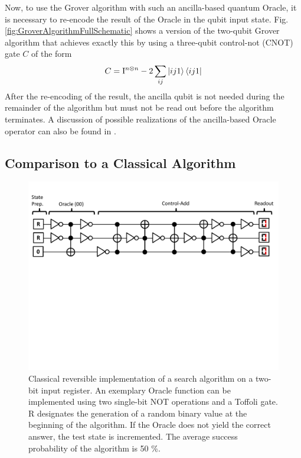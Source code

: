 \smallskip

Now, to use the Grover algorithm with such an ancilla-based quantum Oracle, it is necessary to re-encode the result of the Oracle in the qubit input state. Fig. \ref{fig:GroverAlgorithmFullSchematic} shows a version of the two-qubit Grover algorithm that achieves exactly this by using a three-qubit control-not (CNOT) gate $C$ of the form
%
\begin{equation}
C = \mathrm{I}^{n\otimes n}-2\sum\limits_{ij} \left| ij1 \right>\left< ij1 \right|
\end{equation}
%
After the re-encoding of the result, the ancilla qubit is not needed during the remainder of the algorithm but must not be read out before the algorithm terminates. A discussion of possible realizations of the ancilla-based Oracle operator can also be found in \citep{mermin_quantum_2007}.

\subsection{Comparison to a Classical Algorithm}

\begin{figure}[ht!]
	\centering
		\includegraphics[width=1.0\textwidth]{"./material/papers/grover/classical_reversible_algorithm"}
	\caption{Classical reversible implementation of a search algorithm on a two-bit input register. An exemplary Oracle function can be implemented using two single-bit NOT operations and a Toffoli gate. R designates the generation of a random binary value at the beginning of the algorithm. If the Oracle does not yield the correct answer, the test state is incremented. The average success probability of the algorithm is 50 \%.}
	\label{fig:GroverClassicalReversibleAlgorithm}
\end{figure}

